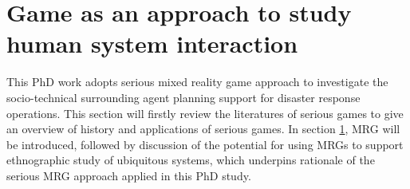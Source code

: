 \section{Game as an approach to study human system interaction } \label{sec:LRMRgame}
This PhD work adopts serious mixed reality game approach to investigate the socio-technical surrounding agent planning support for disaster response operations. This section will firstly review the literatures of serious games to give an overview of history and applications of serious games. In section \ref{sec:LRMRgame}, \acf{MRG} will be introduced, followed by discussion of the potential for using \acf{MRG}s to support ethnographic study of ubiquitous systems, which underpins rationale of the serious \acf{MRG} approach applied in this PhD study.\\ 



